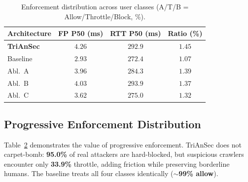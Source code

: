 \documentclass[journal,10pt]{IEEEtran}
\begin{document}
\begin{table}[!t]
\begin{table}[!t]
\centering
\caption{Latency decoupling: fast-path vs.\ client RTT.}
\label{tab:decouple}
\renewcommand{\arraystretch}{1.1}
\setlength{\tabcolsep}{4pt}
\small
\begin{tabular}{@{}lccc@{}}
\toprule
\textbf{Architecture} & \textbf{FP P50 (ms)} & \textbf{RTT P50 (ms)} & \textbf{Ratio (\%)}\\
\midrule
\textbf{TriAnSec}  & $\mathbf{4.26}$ & $\mathbf{292.9}$ & $\mathbf{1.45}$\\
Baseline           & $2.93$ & $272.4$ & $1.07$\\
Abl.\ A            & $3.96$ & $284.3$ & $1.39$\\
Abl.\ B            & $4.03$ & $293.9$ & $1.37$\\
Abl.\ C            & $3.62$ & $275.0$ & $1.32$\\
\bottomrule
\end{tabular}
\end{table}

\subsection{Progressive Enforcement Distribution}
Table~\ref{tab:actions} demonstrates the value of progressive enforcement. TriAnSec does not carpet-bomb: \textbf{95.0\%} of real attackers are hard-blocked, but suspicious crawlers encounter only \textbf{33.9\%} throttle, adding friction while preserving borderline humans. The baseline treats all four classes identically (\textbf{$\sim$99\% allow}).

\begin{table}[!t]
\centering
\caption{Enforcement distribution across user classes (A/T/B = Allow/Throttle/Block, \%).}
\label{tab:actions}
\renewcommand{\arraystretch}{1.1}
\setlength{\tabcolsep}{3pt}
\small
{}
\end{table}


\end{table}
\end{document}
